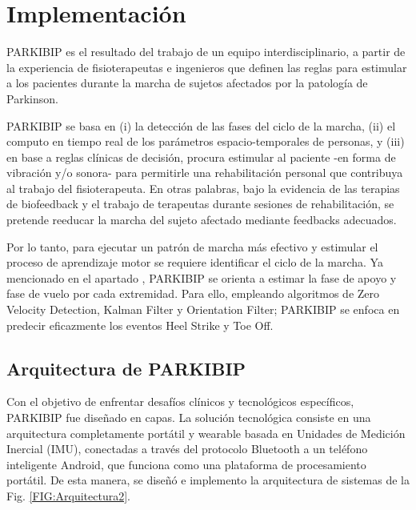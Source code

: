 \chapter{Implementación} \label{chap:implementation}

PARKIBIP es el resultado del trabajo de un equipo interdisciplinario, a partir de la experiencia de fisioterapeutas e ingenieros que definen las reglas para estimular a los pacientes durante la marcha de sujetos afectados por la patología de Parkinson.

PARKIBIP se basa en (i) la detección de las fases del ciclo de la marcha, (ii) el computo en tiempo real de los parámetros espacio-temporales de personas, y (iii) en base a reglas clínicas de decisión, procura estimular al paciente -en forma de vibración y/o sonora- para permitirle una rehabilitación personal que contribuya al trabajo del fisioterapeuta. En otras palabras, bajo la evidencia de las terapias de biofeedback y el trabajo de terapeutas durante sesiones de rehabilitación, se pretende reeducar la marcha del sujeto afectado mediante feedbacks adecuados. 

Por lo tanto, para ejecutar un patrón de marcha más efectivo y estimular el proceso de aprendizaje motor se requiere identificar el ciclo de la marcha. Ya mencionado en el apartado , PARKIBIP se orienta a estimar la fase de apoyo y fase de vuelo por cada extremidad. Para ello, empleando algoritmos de Zero Velocity Detection, Kalman Filter y Orientation Filter; PARKIBIP se enfoca en predecir eficazmente los eventos Heel Strike y Toe Off. 

\section{Arquitectura de PARKIBIP}

Con el objetivo de enfrentar desafíos clínicos y tecnológicos específicos, PARKIBIP fue diseñado en capas. La solución tecnológica consiste en una arquitectura completamente portátil y wearable basada en Unidades de Medición Inercial (IMU), conectadas a través del protocolo Bluetooth a un teléfono inteligente Android, que funciona como una plataforma de procesamiento portátil. De esta manera, se diseñó e implemento la arquitectura de sistemas de la Fig. \ref{FIG:Arquitectura2}.

